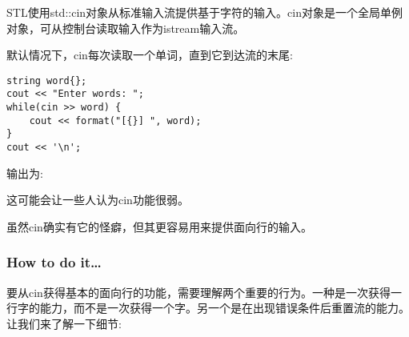 
STL使用std::cin对象从标准输入流提供基于字符的输入。cin对象是一个全局单例对象，可从控制台读取输入作为istream输入流。

默认情况下，cin每次读取一个单词，直到它到达流的末尾:

\begin{lstlisting}[style=styleCXX]
string word{};
cout << "Enter words: ";
while(cin >> word) {
	cout << format("[{}] ", word);
}
cout << '\n';
\end{lstlisting}

输出为:


这可能会让一些人认为cin功能很弱。

虽然cin确实有它的怪癖，但其更容易用来提供面向行的输入。

\subsubsection{How to do it…}

要从cin获得基本的面向行的功能，需要理解两个重要的行为。一种是一次获得一行字的能力，而不是一次获得一个字。另一个是在出现错误条件后重置流的能力。让我们来了解一下细节:

